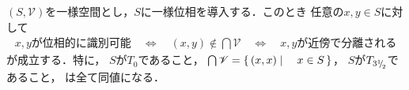 	\begin{screen}
		\begin{thm}
		\label{thm:T_0_iff_T_2_on_uniform_topological_space}
			$(S,\mathscr{V})$を一様空間とし，$S$に一様位相を導入する．このとき
			任意の$x,y \in S$に対して
			\begin{align}
				\mbox{$x,y$が位相的に識別可能}
				\quad \Longleftrightarrow \quad
				(x,y) \notin \bigcap \mathscr{V}
				\quad \Longleftrightarrow \quad
				\mbox{$x,y$が近傍で分離される}
				\label{eq:thm_T_0_iff_T_2_on_uniform_topological_space_0}
			\end{align}
			が成立する．特に，
			$S$が$T_0$であること，
			$\bigcap \mathscr{V} = \left\{\, (x,x) \mid \quad x \in S\, \right\}$，
			$S$が$T_{3{}^1{\mskip -5mu/\mskip -3mu}_2}$であること，
			は全て同値になる．
		\end{thm}
	\end{screen}
	
